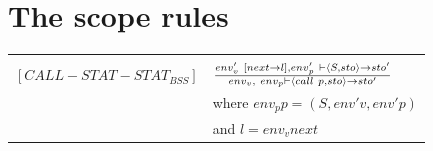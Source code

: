 \section{The scope rules}\label{sec:scope-rules}



\begin{center}
\begin{tabular}{ l l}
\hline
& \\
$[CALL-STAT-STAT_{BSS}]$ & $env'_{v}~[next \rightarrow l], env'_{p}~ \vdash \langle S,sto \rangle \rightarrow sto' \over env_{v}, ~ env_{p} \vdash \langle call~p, sto \rangle \rightarrow sto'$ \\
& where $env_{p}p = (S,env'{v},env'{p})$ \\
& and $l = env_{v}next$ \\
\hline
\end{tabular}
\end{center}







